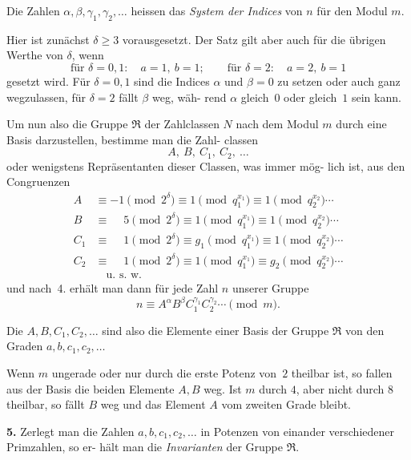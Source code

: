 \documentclass[12pt,a4paper]{article}
\theoremstyle{plain}
\theoremstyle{definition}
\theoremstyle{remark}
\begin{document}
Die Zahlen $\alpha, \beta, \gamma_1, \gamma_2, \ldots$ heissen das \emph{System der
Indices} von $n$ für den Modul $m$.

Hier ist zunächst $\delta \geq 3$ vorausgesetzt. Der Satz gilt aber
auch für die übrigen Werthe von $\delta$, wenn
\[
\text{für } \delta = 0, 1:\quad a = 1, \ b = 1; \qquad
\text{für } \delta = 2:\quad a = 2, \ b = 1
\]
gesetzt wird. Für $\delta = 0, 1$ sind die Indices $\alpha$ und $\beta = 0$ zu
setzen oder auch ganz wegzulassen, für $\delta = 2$ fällt $\beta$ weg, wäh-
rend $\alpha$ gleich~$0$ oder gleich~$1$ sein kann.

Um nun also die Gruppe $\mathfrak{R}$ der Zahlclassen $N$ nach dem
Modul $m$ durch eine Basis darzustellen, bestimme man die Zahl-
classen
\begin{equation}\tag{2}
A, \ B, \ C_1, \ C_2, \ \ldots
\end{equation}
oder wenigstens Repräsentanten dieser Classen, was immer mög-
lich ist, aus den Congruenzen
\begin{align*}
A &\equiv -1 \pmod{2^\delta} \equiv 1 \pmod{q_1^{x_1}} \equiv 1 \pmod{q_2^{x_2}} \cdots \\
B &\equiv \phantom{-}5 \pmod{2^\delta} \equiv 1 \pmod{q_1^{x_1}} \equiv 1 \pmod{q_2^{x_2}} \cdots \\
C_1 &\equiv \phantom{-}1 \pmod{2^\delta} \equiv g_1 \pmod{q_1^{x_1}} \equiv 1 \pmod{q_2^{x_2}} \cdots \\
C_2 &\equiv \phantom{-}1 \pmod{2^\delta} \equiv 1 \pmod{q_1^{x_1}} \equiv g_2 \pmod{q_2^{x_2}} \cdots \\
  &\quad \text{u.~s.~w.}
\end{align*}
und nach~4. erhält man dann für jede Zahl $n$ unserer Gruppe
\begin{equation}\tag{3}
n \equiv A^\alpha B^\beta C_1^{\gamma_1} C_2^{\gamma_2} \cdots \pmod{m}.
\end{equation}

Die $A, B, C_1, C_2, \ldots$ sind also die Elemente einer Basis der
Gruppe $\mathfrak{R}$ von den Graden $a, b, c_1, c_2, \ldots$

Wenn $m$ ungerade oder nur durch die erste Potenz von~$2$
theilbar ist, so fallen aus der Basis die beiden Elemente $A, B$
weg. Ist $m$ durch $4$, aber nicht durch $8$ theilbar, so fällt $B$ weg
und das Element $A$ vom zweiten Grade bleibt.

\textbf{5.} Zerlegt man die Zahlen $a, b, c_1, c_2, \ldots$ in Potenzen
von einander verschiedener Primzahlen, so er-
hält man die \emph{Invarianten} der Gruppe $\mathfrak{R}$.
\end{document}
